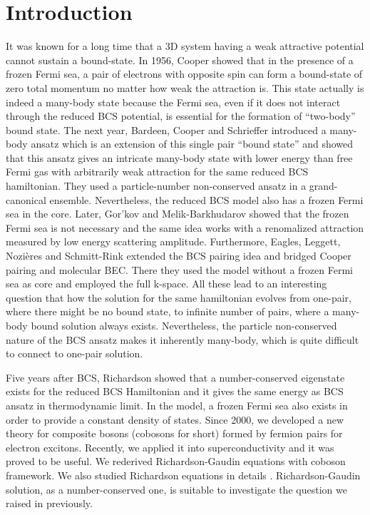 \documentclass[aps,prb,showpacs,reprint]{revtex4-1}
\begin{document}
\section{Introduction}
It was known for a long time that a 3D system having a weak attractive potential cannot sustain a bound-state.  In 1956, Cooper showed that in the presence of a frozen Fermi sea, a pair of electrons with opposite spin can form a bound-state of zero total momentum  no matter how weak the attraction is\cite{Cooper}.  This state actually is indeed a many-body state because the  Fermi sea, even if it does not interact through the reduced BCS potential,  is essential for the formation of ``two-body'' bound state.   The next year, Bardeen, Cooper and Schrieffer introduced a many-body ansatz which is an extension of this single pair ``bound state'' and showed that this ansatz gives an intricate many-body state with lower energy than free Fermi gas with arbitrarily weak attraction\cite{BCS} for the same reduced BCS hamiltonian.  They used a particle-number non-conserved ansatz in a grand-canonical ensemble.  Nevertheless, the reduced BCS model also has a frozen Fermi sea in the core. Later,   Gor'kov and Melik-Barkhudarov showed that the frozen Fermi sea is not necessary and the same idea works with a renomalized attraction measured by low energy scattering amplitude\cite{Gorkov}.   Furthermore, Eagles\cite{Eagle}, Leggett\cite{LeggettCrossover}, Nozi\`{e}res and Schmitt-Rink\cite{Nozieres} extended the BCS pairing idea and bridged Cooper pairing and molecular BEC. There they used the model without a frozen Fermi sea as core and employed the full k-space.  All these lead to an interesting question that how the solution for the same hamiltonian evolves from one-pair, where there might be no bound state, to infinite number of pairs, where a many-body bound solution always exists.  Nevertheless, the particle non-conserved nature of the BCS ansatz makes it inherently many-body, which is quite difficult to connect to one-pair solution.  

Five years after BCS, Richardson showed that a number-conserved eigenstate exists for the reduced BCS Hamiltonian and it gives the same energy as BCS ansatz in thermodynamic limit\cite{Richardson1,Richardson2,Richardson3,Richardson1968,gaudin}.  In the model, a frozen Fermi sea also exists in order to provide a constant density of states.  Since 2000, we developed a new theory for composite bosons (cobosons for short) formed by fermion pairs for electron excitons\cite{CobosonPhysicsReports}.   Recently, we applied it into superconductivity and it was proved to be useful.  We rederived Richardson-Gaudin equations with coboson framework\cite{CobosonBcsRich}. We also studied Richardson equations in details \cite{CombescotCooper,combescotBCS}.  Richardson-Gaudin solution, as a number-conserved one, is  suitable to investigate the question we raised in previously.  
\end{document}
